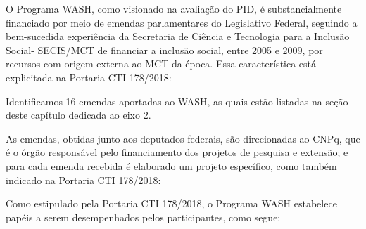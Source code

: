 O Programa WASH, como visionado na avaliação do PID, é substancialmente financiado por meio de emendas parlamentares do Legislativo Federal, seguindo a bem-sucedida experiência da Secretaria de Ciência e Tecnologia para a Inclusão Social- SECIS/MCT de financiar a inclusão social, entre 2005 e 2009, por recursos com origem externa ao MCT da época. Essa característica está explicitada na Portaria CTI 178/2018:


\noindent\begin{flushright}\mbox{\linespread{1}\selectfont\centering{}}\end{flushright}


Identificamos 16 emendas aportadas ao WASH, as quais estão listadas na seção deste capítulo dedicada ao eixo 2.

As emendas, obtidas junto aos deputados federais, são direcionadas ao CNPq, que é o órgão responsável pelo financiamento dos projetos de pesquisa e extensão; e para cada emenda recebida é elaborado um projeto específico, como também indicado na Portaria CTI 178/2018:


\noindent\begin{flushright}\mbox{\linespread{1}\selectfont\centering{}}\end{flushright}


Como estipulado pela Portaria CTI 178/2018, o Programa WASH estabelece papéis a serem desempenhados pelos participantes, como segue:


